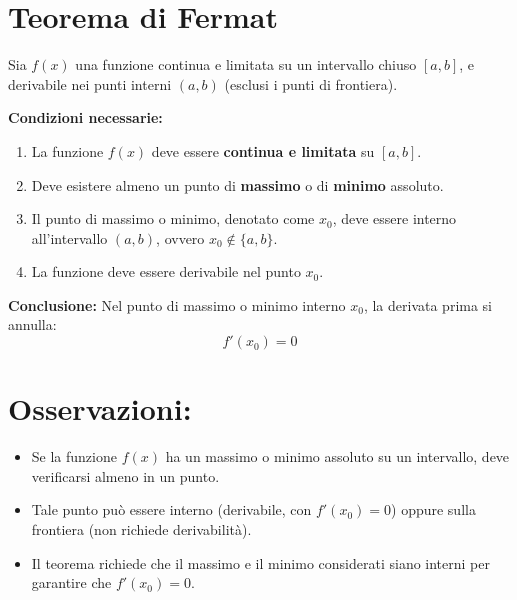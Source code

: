 \documentclass[12pt]{article}
\begin{document}
\Huge

\section*{Teorema di Fermat}

Sia \( f(x) \) una funzione continua e limitata su un intervallo chiuso \([a, b]\), e derivabile nei punti interni \((a, b)\) (esclusi i punti di frontiera).  

\vspace{0.5cm}

\textbf{Condizioni necessarie:}
\begin{enumerate}
    \item La funzione \( f(x) \) deve essere \textbf{continua e limitata} su \([a, b]\).
    \item Deve esistere almeno un punto di \textbf{massimo} o di \textbf{minimo} assoluto.  
    \item Il punto di massimo o minimo, denotato come \( x_0 \), deve essere interno all'intervallo \((a, b)\), ovvero \( x_0 \notin \{a, b\}\).
    \item La funzione deve essere derivabile nel punto \( x_0 \).
\end{enumerate}

\vspace{0.5cm}

\textbf{Conclusione:}  
Nel punto di massimo o minimo interno \( x_0 \), la derivata prima si annulla:
\[
f'(x_0) = 0
\]

\vspace{1cm}

\section*{Osservazioni:}

\begin{itemize}
    \item Se la funzione \( f(x) \) ha un massimo o minimo assoluto su un intervallo, deve verificarsi almeno in un punto. 
    \item Tale punto può essere interno (derivabile, con \( f'(x_0) = 0 \)) oppure sulla frontiera (non richiede derivabilità).
    \item Il teorema richiede che il massimo e il minimo considerati siano interni per garantire che \( f'(x_0) = 0 \).
\end{itemize}
\end{document}
